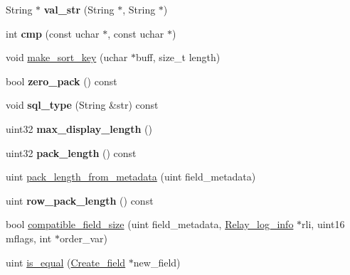\begin{DoxyCompactItemize}
\mbox{\label{classField__new__decimal_a4bf9eda39da5c874db47905e6efe0a5b}} 
String $\ast$ {\bfseries val\+\_\+str} (String $\ast$, String $\ast$)
\item 
\mbox{\label{classField__new__decimal_af3329c75f6b342c6846b988095bbb02b}} 
int {\bfseries cmp} (const uchar $\ast$, const uchar $\ast$)
\item 
void \mbox{\hyperlink{classField__new__decimal_a10b28a60684090afc6b4c44dcad8c975}{make\+\_\+sort\+\_\+key}} (uchar $\ast$buff, size\+\_\+t length)
\item 
\mbox{\label{classField__new__decimal_ac65a3e25d88fdd9f476eb96a5d2c0c8c}} 
bool {\bfseries zero\+\_\+pack} () const
\item 
\mbox{\label{classField__new__decimal_a3edc75bf941d320daa21414efb40df11}} 
void {\bfseries sql\+\_\+type} (String \&str) const
\item 
\mbox{\label{classField__new__decimal_ad2b8b7307ebd3be91190a1f3b4480a56}} 
uint32 {\bfseries max\+\_\+display\+\_\+length} ()
\item 
\mbox{\label{classField__new__decimal_a994547c35eb4a9cc16e3419cf6254c3c}} 
uint32 {\bfseries pack\+\_\+length} () const
\item 
uint \mbox{\hyperlink{classField__new__decimal_a295d3ea96855ddbf89b6e890b5ac1e2d}{pack\+\_\+length\+\_\+from\+\_\+metadata}} (uint field\+\_\+metadata)
\item 
\mbox{\label{classField__new__decimal_ae5a9b754b1b0e44b8a85e952422cb222}} 
uint {\bfseries row\+\_\+pack\+\_\+length} () const
\item 
bool \mbox{\hyperlink{classField__new__decimal_a55356fb799e02d0d09605cf5c1bbbc11}{compatible\+\_\+field\+\_\+size}} (uint field\+\_\+metadata, \mbox{\hyperlink{classRelay__log__info}{Relay\+\_\+log\+\_\+info}} $\ast$rli, uint16 mflags, int $\ast$order\+\_\+var)
\item 
uint \mbox{\hyperlink{classField__new__decimal_a322bc9ecdcf1ffab0787b933fac016d9}{is\+\_\+equal}} (\mbox{\hyperlink{classCreate__field}{Create\+\_\+field}} $\ast$new\+\_\+field)

\end{DoxyCompactItemize}
